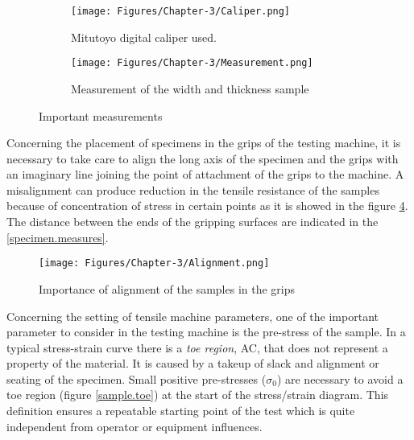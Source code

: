 \begin{enumerate}[leftmargin=0in, label=\emph{\alph*}.]
\begin{figure}[H]
	\centering
	\begin{subfigure}[t]{0.5\textwidth}
		\texttt{[image: Figures/Chapter-3/Caliper.png]}
		\caption{Mitutoyo digital caliper used.}
		\label{sample.caliper}
	\end{subfigure}
	\hfill
	\begin{subfigure}[t]{0.45\textwidth}
		\texttt{[image: Figures/Chapter-3/Measurement.png]}
		\caption{Measurement of the width and thickness sample}
		\label{sample.measurement}
	\end{subfigure}
	\caption{Important measurements}
	\label{measurements}
	
\end{figure}

Concerning the placement of specimens in the grips of the testing machine, it is necessary to take care to align the long axis of the specimen and the grips with an imaginary line joining the point of attachment of the grips to the machine. A misalignment can produce reduction in the tensile resistance of the samples because of concentration of stress in certain points as it is showed in the figure \ref{sample.alignment}. The distance between the ends of the gripping surfaces are indicated in the \ref{specimen.measures}.

\begin{figure} [H]
	\centering
	\texttt{[image: Figures/Chapter-3/Alignment.png]}
	\caption{Importance of alignment of the samples in the grips}
	\label{sample.alignment}
\end{figure}



Concerning  the setting of tensile machine parameters, 
one of the important parameter to consider in the testing machine is the pre-stress of the sample. 
In a typical stress-strain curve there is a \textit{toe region}, AC, that does not represent a property of the material.  It is caused by a takeup of slack and alignment or seating of the specimen.
Small positive pre-stresses ($\sigma_{0}$) are necessary to avoid a toe region (figure \ref{sample.toe}) at the start of the stress/strain diagram.  
This definition ensures a repeatable starting point of the test which is quite independent from operator or equipment influences.


\end{enumerate}

